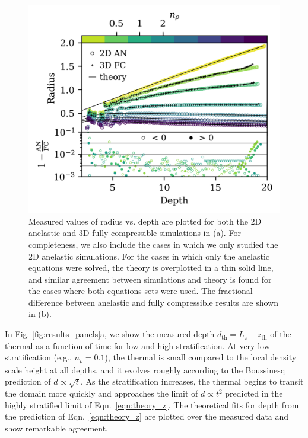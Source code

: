 \documentclass[twocolumn, amsmath, amsfonts, amssymb, trackchanges]{aastex62}
\begin{document}
\begin{figure}[t!]
    \includegraphics[width=\columnwidth]{diff_AN_FC.png}
    \caption{
	Measured values of radius vs. depth are plotted for both the 2D anelastic and 3D fully compressible simulations in (a). 
	For completeness, we also include the cases in which we only studied the 2D anelastic simulations.
	For the cases in which only the anelastic equations were solved, the theory is overplotted in a thin solid line, and similar agreement between simulations and theory is found for the cases where both equations sets were used.
	The fractional difference between anelastic and fully compressible results are shown in (b).
    \label{fig:diff} }
\end{figure}



In Fig. \ref{fig:results_panels}a, we show the measured depth $d_{\text{th}} = L_z - z_{\text{th}}$ of the thermal as a function of time for low and high stratification. 
At very low stratification (e.g., $n_\rho = 0.1$), the thermal is small compared to the local density scale height at all depths, and it evolves roughly according to the Boussinesq prediction of $d \propto \sqrt{t}$. 
As the stratification increases, the thermal begins to transit the domain more quickly and approaches the limit of $d \propto t^2$ predicted in the highly stratified limit of Eqn.~\ref{eqn:theory_z}. 
The theoretical fits for depth from the prediction of Eqn.~\ref{eqn:theory_z} are plotted over the measured data and show remarkable agreement.
\end{document}

